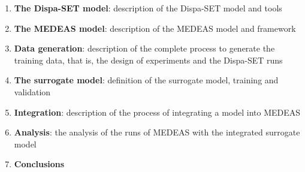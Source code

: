 \begin{enumerate}
    \item \textbf{The Dispa-SET model}: description of the Dispa-SET model and tools
    \item \textbf{The MEDEAS model}: description of the MEDEAS model and framework
    \item \textbf{Data generation}: description of the complete process to generate the training data, that is, the design of experiments and the Dispa-SET runs
    \item \textbf{The surrogate model}: definition of the surrogate model, training and validation
    \item \textbf{Integration}: description of the process of integrating a model into MEDEAS
    \item \textbf{Analysis}: the analysis of the runs of MEDEAS with the integrated surrogate model
    \item \textbf{Conclusions}
\end{enumerate}

